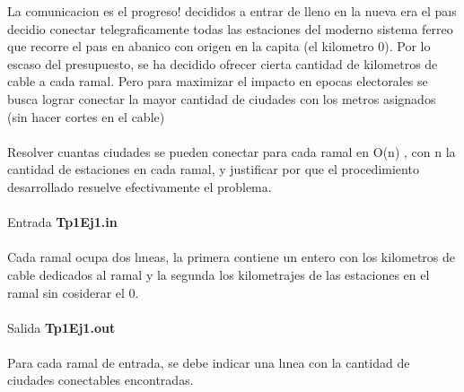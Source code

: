  La comunicacion es el progreso! decididos a entrar de lleno en la nueva era el paıs decidio conectar
telegraficamente todas las estaciones del moderno sistema ferreo que recorre el paıs en abanico con origen
en la capita (el kilometro 0). Por lo escaso del presupuesto, se ha decidido ofrecer cierta cantidad de
kilometros de cable a cada ramal. Pero para maximizar el impacto en epocas electorales se busca lograr
conectar la mayor cantidad de ciudades con los metros asignados (sin hacer cortes en el cable)\\\\
Resolver cuantas ciudades se pueden conectar para cada ramal en O(n) , con n la cantidad de estaciones
en cada ramal, y justificar por que el procedimiento desarrollado resuelve efectivamente el problema.\\\\
Entrada \textbf{Tp1Ej1.in}\\\\
Cada ramal ocupa dos lıneas, la primera contiene un entero con los kilometros de cable dedicados al
ramal y la segunda los kilometrajes de las estaciones en el ramal sin cosiderar el 0.\\\\
Salida \textbf{Tp1Ej1.out}\\\\
Para cada ramal de entrada, se debe indicar una lınea con la cantidad de ciudades conectables encontradas.\\